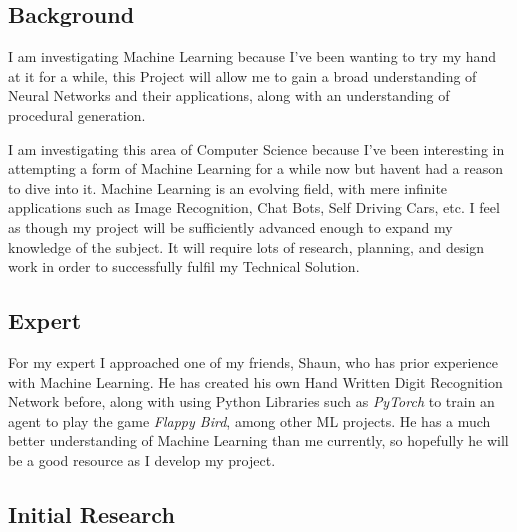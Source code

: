 \begin{flushleft}
        \subsection{Background}
            \vspace{0.2cm}
            I am investigating Machine Learning because I've been wanting to try my hand at it for a while, this Project
            will allow me to gain a broad understanding of Neural Networks and their applications, along with an understanding
            of procedural generation.

            I am investigating this area of Computer Science because I've been interesting in attempting a form of
            Machine Learning for a while now but havent had a reason to dive into it. Machine Learning is an evolving
            field, with mere infinite applications such as Image Recognition, Chat Bots, Self Driving Cars, 
            etc. I feel as though my project will be sufficiently advanced enough to expand my knowledge of the subject.
            It will require lots of research, planning, and design work in order to successfully fulfil my Technical
            Solution. \\

            \vspace{0.2cm}
        \subsection{Expert}
            \vspace{0.2cm}
            For my expert I approached one of my friends, Shaun, who has prior experience with Machine Learning. He has
            created his own Hand Written Digit Recognition Network before, along with using Python Libraries such as 
            \textit{PyTorch} to train an agent to play the game \textit{Flappy Bird}, among other ML projects. He has 
            a much better understanding of Machine Learning than me currently, so hopefully he will be a good resource 
            as I develop my project. \\

            \vspace{0.2cm}
            
        \subsection{Initial Research}

\end{flushleft}
